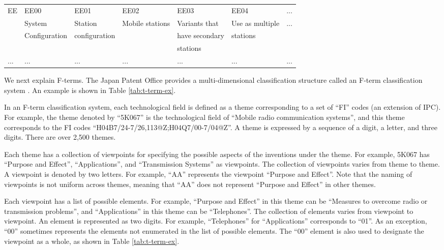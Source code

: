 \documentclass[english]{jnlp_1.2c}
\begin{document}
\begin{table}[b]
\begin{center}
\begin{tabular}{|l|l|l|l|l|l|l|}
EE & EE00                & EE01                  & EE02                  & EE03                  & EE04                  & ... \\\cline{2-7}
   & System              & Station              & Mobile stations     & Variants that      & Use as  multiple  & ... \\
   & Configuration       & configuration         &                       & have secondary        & stations              &        \\
   &                     &                       &                       & stations              &                       &        \\\hline
... & ...                  & ...                    & ...                    & ...                    & ...                    & ... \\\hline
\end{tabular}
\end{center}
\end{table}


We next explain F-terms. 
The Japan Patent Office provides a multi-dimensional classification structure called an F-term classification system \cite{JPO_2_2,Schellner2002_2}.
An example is shown in Table \ref{tab:t-term-ex}.

In an F-term classification system, each technological field is defined as a theme corresponding to a set of ``FI'' codes (an extension of IPC).
For example, the theme denoted by ``5K067'' is the technological field of ``Mobile radio communication systems'', and this theme corresponds to the FI codes  ``H04B7/24-7/26,113@Z;H04Q7/00-7/04@Z''.
A theme is expressed by a sequence of a digit, a letter, and three digits.
There are over 2,500 themes.

Each theme has a collection of viewpoints for specifying the possible aspects of the inventions under the theme.
For example, 5K067 has ``Purpose and Effect'', ``Applications'', and ``Transmission Systems'' as viewpoints.
The collection of viewpoints varies from theme to theme.
A viewpoint is denoted by two letters.
For example, ``AA'' represents the viewpoint ``Purpose and Effect''.
Note that the naming of viewpoints is not uniform across themes, meaning that ``AA'' does not represent ``Purpose and Effect'' in other themes.

Each viewpoint has a list of possible elements.
For example, ``Purpose and Effect'' in this theme can be ``Measures to overcome radio or transmission problems'', and ``Applications'' in this theme can be ``Telephones''. 
The collection of elements varies from viewpoint to viewpoint.
An element is represented as two digits.
For example, ``Telephones'' for ``Applications'' corresponds to ``01''.
As an exception, ``00'' sometimes represents the elements not enumerated in the list of possible elements.
The ``00'' element is also used to designate the viewpoint as a whole, as shown in Table \ref{tab:t-term-ex}.
\end{document}
